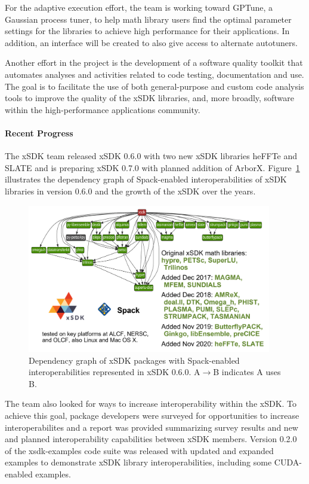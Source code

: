 For the adaptive execution effort, the team is working toward GPTune, a Gaussian process tuner, to help math library users find the optimal parameter settings for the libraries to achieve high performance for their applications. In addition, an interface will be created to also give access to alternate autotuners.

Another effort in the project is the development of a software quality toolkit that automates analyses and activities related to code testing, documentation and use. The goal is to facilitate the use of both general-purpose and custom code analysis tools to improve the quality of the xSDK libraries, and, more broadly, software within the high-performance applications community.

\paragraph{Recent Progress}

The xSDK team released xSDK 0.6.0 with two new xSDK libraries heFFTe and SLATE and is preparing xSDK 0.7.0 with planned addition of ArborX.
Figure~\ref{fig:xsdk-schematic} illustrates the dependency graph of Spack-enabled interoperabilities of xSDK libraries in version 0.6.0 and the growth of the xSDK over the years.
\begin{figure}[htb]
	\centering
	\includegraphics[width=4.2in]{projects/2.3.3-MathLibs/2.3.3.01-xSDK/xsdk-0.6.0.png}
      \caption{\label{fig:xsdk-schematic} Dependency graph of xSDK packages with Spack-enabled  interoperabilities represented in xSDK 0.6.0. A$\rightarrow$B indicates A uses B.}
\end{figure}
The team also looked for ways to increase interoperability within the xSDK. To achieve this goal, package developers were surveyed for opportunities to increase interoperabilites and a report was provided summarizing survey results and new and planned interoperability capabilities between xSDK members. Version 0.2.0 of the xsdk-examples code suite was released with updated and expanded examples to demonstrate xSDK library interoperabilities, including some CUDA-enabled examples.

